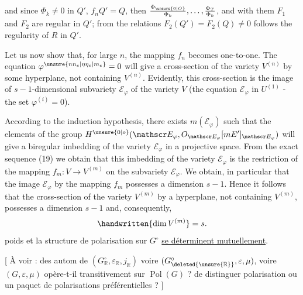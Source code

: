 and since $\Phi_k\ne 0$ in $Q'$, $f_nQ'=Q$, then $\frac{\Phi_{\unsure{0|O}}}{\Phi_k},\ldots,\frac{\Phi_T}{\Phi_k}$, and
with them $F_1$ and $F_2$ are regular in $Q'$; from the relations
$F_2(Q')=F_2(Q)\ne 0$ follows the regularity of $R$ in $Q'$.

Let us now show that, for large $n$, the mapping $f_n$
becomes one-to-one. The equation $\varphi^{\unsure{nn_e|\eta\eta_e|m_e}}=0$ will give a
cross-section of the variety $V^{(n)}$ by some hyperplane, not
containing $V^{(n)}$. Evidently, this cross-section is the image
of $s-1$-dimensional subvariety $\mathscr E_{\varphi}$ of the variety $V$
(the equation $\mathscr E_{\varphi}$ in $U^{(1)}$ - the set $\varphi^{(i)}=0$).

According to the induction hypothesis, there exists
$m(\mathscr E_{\varphi})$ such that the elements of the group 
$H^{\unsure{0|o}}(\mathscr E_{\varphi},O_{\mathscr E_{\varphi}}[mE']_{\mathscr E_{\varphi}})$ will give a biregular imbedding of
the variety $\mathscr E_{\varphi}$ in a projective space. From the exact
sequence (19) we obtain that this imbedding of the variety
$\mathscr E_{\varphi}$ is the restriction of the mapping $f_m\colon V\to V^{(m)}$ on
the subvariety $\mathscr E_{\varphi}$. We obtain, in particular that the
image $\mathscr E_{\varphi}$ by the mapping $f_m$ possesses a dimension $s-1$.
Hence it follows that the cross-section of the variety $V^{(m)}$
by a hyperplane, not containing $V^{(m)}$, possesses a dimension
$s-1$ and, consequently,
\[
\handwritten{\dim V^{(m)}}=s.
\]
poids et la structure de polarisation sur $G^\circ$
\uline{se déterminent mutuellement}.

 [ À voir :  des autom de $(G^\circ_{\mathbb R},\varepsilon_{\mathbb R},j_{\mathbb R})$
voire $(G^\circ_{\deleted{\unsure{\mathbb R}}},\varepsilon,\mu)$, voire $(G,\varepsilon,\mu)$ opère-t-il
transitivement sur $\operatorname{Pol}(G)$ ?  
    de distinguer  
polarisation ou un paquet de polarisations
préférentielles ? ]

